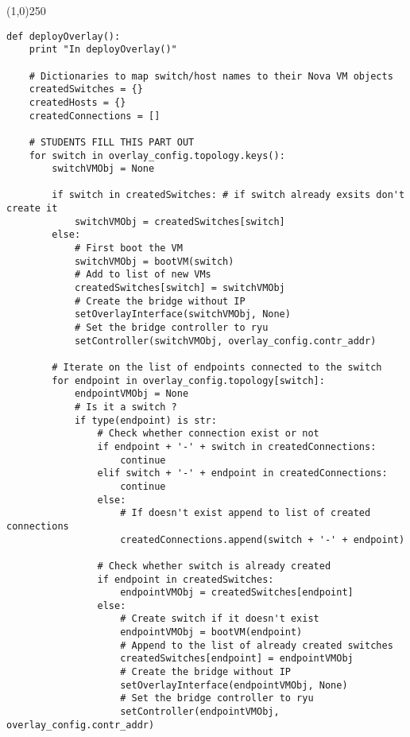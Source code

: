 \documentclass[12pt]{article}
\begin{document}
\begin{center}
	\line(1,0){250}
\end{center}
\begin{verbatim}
def deployOverlay():
    print "In deployOverlay()"

    # Dictionaries to map switch/host names to their Nova VM objects
    createdSwitches = {}
    createdHosts = {}
    createdConnections = []

    # STUDENTS FILL THIS PART OUT
    for switch in overlay_config.topology.keys():
        switchVMObj = None

        if switch in createdSwitches: # if switch already exsits don't create it
            switchVMObj = createdSwitches[switch]
        else:
            # First boot the VM
            switchVMObj = bootVM(switch)
            # Add to list of new VMs
            createdSwitches[switch] = switchVMObj
            # Create the bridge without IP
            setOverlayInterface(switchVMObj, None)
            # Set the bridge controller to ryu
            setController(switchVMObj, overlay_config.contr_addr)

        # Iterate on the list of endpoints connected to the switch
        for endpoint in overlay_config.topology[switch]:
            endpointVMObj = None
            # Is it a switch ?
            if type(endpoint) is str:
                # Check whether connection exist or not
                if endpoint + '-' + switch in createdConnections:
                    continue
                elif switch + '-' + endpoint in createdConnections:
                    continue
                else:
                    # If doesn't exist append to list of created connections
                    createdConnections.append(switch + '-' + endpoint)

                # Check whether switch is already created
                if endpoint in createdSwitches:
                    endpointVMObj = createdSwitches[endpoint]
                else:
                    # Create switch if it doesn't exist
                    endpointVMObj = bootVM(endpoint)
                    # Append to the list of already created switches
                    createdSwitches[endpoint] = endpointVMObj
                    # Create the bridge without IP
                    setOverlayInterface(endpointVMObj, None)
                    # Set the bridge controller to ryu
                    setController(endpointVMObj, overlay_config.contr_addr)


\end{verbatim}
\end{document}
